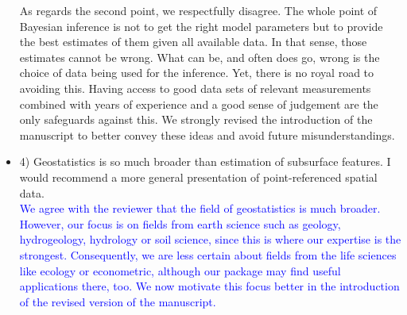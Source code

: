 \documentclass{article}
\begin{document}
\begin{itemize}
{    As regards the second point, we respectfully disagree. The whole point of Bayesian inference is not to get the right model parameters but to provide the best estimates of them given all available data. In that sense, those estimates cannot be wrong. What can be, and often does go, wrong is the choice of data being used for the inference. Yet, there is no royal road to avoiding this. Having access to good data sets of relevant measurements combined with years of experience and a good sense of judgement are the only safeguards against this.
    We strongly revised the introduction of the manuscript to better convey these ideas and avoid future misunderstandings.}
    
    
    \item 4) Geostatistics is so much broader than estimation of subsurface features. I would recommend a more general presentation of point-referenced spatial data.\\
    \textcolor{blue}{We agree with the reviewer that the field of geostatistics is much broader. However, our focus is on fields from earth science such as geology, hydrogeology, hydrology or soil science, since this is where our expertise is the strongest. Consequently, we are less certain about fields from the life sciences like ecology or econometric, although our package may find useful applications there, too. We now motivate this focus better in the introduction of the revised version of the manuscript. }  
    

\end{itemize}
\end{document}

